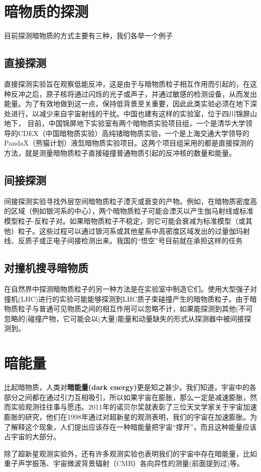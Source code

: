 \documentclass[UTF8]{ctexart}
\begin{document}
\section{暗物质的探测}
目前探测暗物质的方式主要有三种，我们各举一个例子
\subsection{直接探测}
直接探测实验旨在观察低能反冲，这是由于与暗物质粒子相互作用而引起的，在这种反冲之后，原子核将通过闪烁的光子或声子，并通过敏感的检测设备，从而发出能量。为了有效地做到这一点，保持低背景至关重要，因此此类实验必须在地下深处进行，以减少来自宇宙射线的干扰。中国也建有这样的实验室，位于四川锦屏山地下，
目前，中国锦屏地下实验室有两个暗物质实验项目组，一个是清华大学领导的CDEX（中国暗物质实验）高纯锗暗物质实验，一个是上海交通大学领导的PandaX（熊猫计划）液氙暗物质实验项目。这两个项目组采用的都是直接探测的方法，就是测量暗物质粒子直接碰撞普通物质引起的反冲核的数量和能量。
\subsection{间接探测}
间接探测实验寻找外层空间暗物质粒子湮灭或衰变的产物。例如，在暗物质密度高的区域（例如银河系的中心），两个暗物质粒子可能会湮灭以产生伽马射线或标准模型粒子-反粒子对。如果暗物质粒子不稳定，则它可能会衰减为标准模型（或其他）粒子。这些过程可以通过银河系或其他星系中高密度区域发出的过量伽玛射线、反质子或正电子间接检测出来。我国的“悟空”号目前就在承担这样的任务
\subsection{对撞机搜寻暗物质}
在自然界中探测暗物质粒子的另一种方法是在实验室中制造它们。使用大型强子对撞机(LHC)进行的实验可能能够探测到LHC质子束碰撞产生的暗物质粒子。由于暗物质粒子与普通可见物质之间的相互作用可以忽略不计，如果能探测到其他(不可忽略的)碰撞产物，它可能会以(大量)能量和动量缺失的形式从探测器中被间接探测到。
\section{暗能量}
比起暗物质，人类对\textbf{暗能量(dark energy)}更是知之甚少。我们知道，宇宙中的各部分之间都在通过引力互相吸引，所以如果宇宙在膨胀，那么一定是减速膨胀，然而实验观测往往事与愿违。2011年的诺贝尔奖就表彰了三位天文学家关于宇宙加速膨胀的研究，他们在1998年通过对超新星的观测表明，我们的宇宙在加速膨胀。为了解释这个现象，人们提出应该存在一种暗能量把宇宙“撑开”，而且这种能量应该占宇宙的大部分。

除了超新星观测实验外，还有许多观测实验也表明我们的宇宙中存在暗能量，比如重子声学振荡、宇宙微波背景辐射（CMB）各向异性的测量(前面提到过)等。
\end{document}
